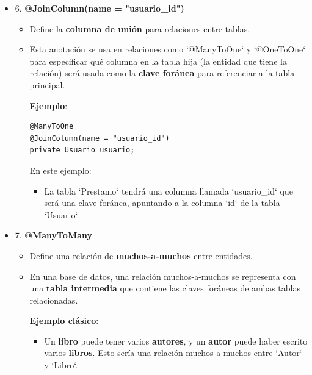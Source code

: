 \documentclass[11pt]{article}
\begin{document}
\begin{itemize}
\begin{itemize}
\begin{itemize}
\textbf{\textbf{Ejemplo}}:
\begin{verbatim}
@OneToMany(mappedBy = "autor", cascade = CascadeType.ALL)
private List<Libro> libros;
\end{verbatim}
Aquí:
\begin{itemize}
\item `mappedBy = "autor"` indica que la propiedad `autor` en la entidad `Libro` es la que define la relación.
\item `cascade = CascadeType.ALL` especifica que cualquier operación en la entidad \textbf{\textbf{Autor}} (como eliminar o actualizar) también afectará a los libros asociados.
\end{itemize}
\end{itemize}

\item 6. \textbf{\textbf{@JoinColumn(name = "usuario\_id")}}
\label{sec:org4dfde5a}
\begin{itemize}
\item Define la \textbf{\textbf{columna de unión}} para relaciones entre tablas.
\item Esta anotación se usa en relaciones como `@ManyToOne` y `@OneToOne` para especificar qué columna en la tabla hija (la entidad que tiene la relación) será usada como la \textbf{\textbf{clave foránea}} para referenciar a la tabla principal.

\textbf{\textbf{Ejemplo}}:
\begin{verbatim}
@ManyToOne
@JoinColumn(name = "usuario_id")
private Usuario usuario;
\end{verbatim}
En este ejemplo:
\begin{itemize}
\item La tabla `Prestamo` tendrá una columna llamada `usuario\_id` que será una clave foránea, apuntando a la columna `id` de la tabla `Usuario`.
\end{itemize}
\end{itemize}

\item 7. \textbf{\textbf{@ManyToMany}}
\label{sec:org99938e7}
\begin{itemize}
\item Define una relación de \textbf{\textbf{muchos-a-muchos}} entre entidades.
\item En una base de datos, una relación muchos-a-muchos se representa con una \textbf{\textbf{tabla intermedia}} que contiene las claves foráneas de ambas tablas relacionadas.

\textbf{\textbf{Ejemplo clásico}}:
\begin{itemize}
\item Un \textbf{\textbf{libro}} puede tener varios \textbf{\textbf{autores}}, y un \textbf{\textbf{autor}} puede haber escrito varios \textbf{\textbf{libros}}. Esto sería una relación muchos-a-muchos entre `Autor` y `Libro`.
\end{itemize}


\end{itemize}
\end{itemize}
\end{itemize}
\end{document}
